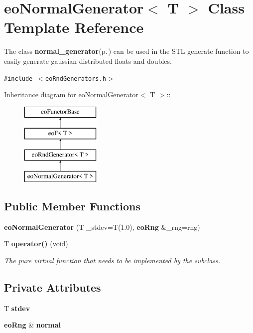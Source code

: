 \section{eo\-Normal\-Generator$<$ T $>$ Class Template Reference}
\label{classeo_normal_generator}
The class {\bf normal\_\-generator}{\rm (p.\,\pageref{classnormal__generator})} can be used in the STL generate function to easily generate gaussian distributed floats and doubles.  


{\tt \#include $<$eo\-Rnd\-Generators.h$>$}

Inheritance diagram for eo\-Normal\-Generator$<$ T $>$::\begin{figure}[H]
\begin{center}
\leavevmode
\includegraphics[height=4cm]{classeo_normal_generator}
\end{center}
\end{figure}
\subsection*{Public Member Functions}
\begin{CompactItemize}
\item 
{\bf eo\-Normal\-Generator} (T \_\-stdev=T(1.0), {\bf eo\-Rng} \&\_\-rng=rng)\label{classeo_normal_generator_a0}

\item 
T {\bf operator()} (void)\label{classeo_normal_generator_a1}

\begin{CompactList}\small\item\em The pure virtual function that needs to be implemented by the subclass. \item\end{CompactList}\end{CompactItemize}
\subsection*{Private Attributes}
\begin{CompactItemize}
\item 
T {\bf stdev}\label{classeo_normal_generator_r0}

\item 
{\bf eo\-Rng} \& {\bf normal}\label{classeo_normal_generator_r1}

\end{CompactItemize}


